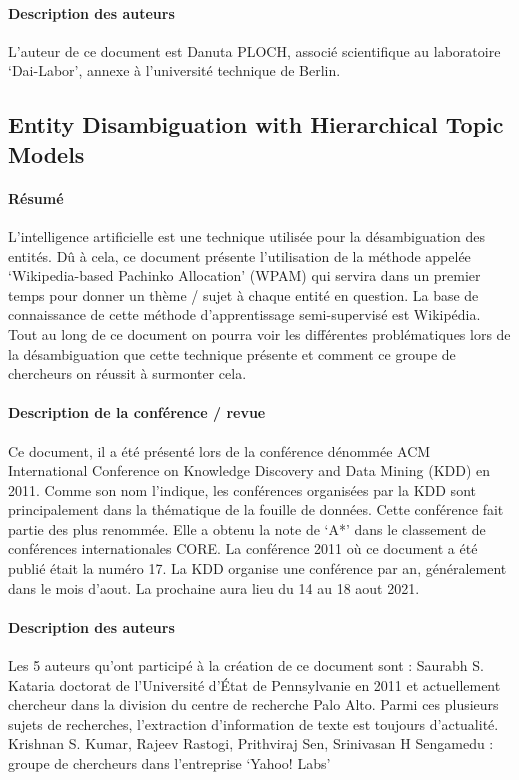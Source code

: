 \documentclass{article}
\begin{document}
\paragraph{Description des auteurs}
L’auteur de ce document est Danuta PLOCH, associé scientifique au laboratoire ‘Dai-Labor’, annexe à l’université technique de Berlin.


\subsection{Entity Disambiguation with Hierarchical Topic Models \cite{article-14}}

\paragraph{Résumé}
L’intelligence artificielle est une technique utilisée pour la désambiguation des entités. Dû à cela, ce document présente l’utilisation de la méthode appelée ‘Wikipedia-based
Pachinko Allocation’ (WPAM) qui servira dans un premier temps pour donner un thème / sujet à chaque entité en question. La base de connaissance de cette méthode d’apprentissage semi-supervisé est Wikipédia.  Tout au long de ce document on pourra voir les différentes problématiques lors de la désambiguation que cette technique présente et comment ce groupe de chercheurs on réussit à surmonter cela. 



\paragraph{Description de la conférence / revue}
Ce document, il a été présenté lors de la conférence dénommée ACM International Conference on Knowledge Discovery and Data Mining (KDD) en 2011. 
Comme son nom l’indique, les conférences organisées par la KDD sont principalement dans la thématique de la fouille de données. Cette conférence fait partie des plus renommée. Elle a obtenu la note de ‘A*’ dans le classement de conférences internationales CORE. 
La conférence 2011 où ce document a été publié était la numéro 17. La KDD organise une conférence par an, généralement dans le mois d’aout. La prochaine aura lieu du 14 au 18 aout 2021.


\paragraph{Description des auteurs}
Les 5 auteurs qu'ont participé à la création de ce document sont :
Saurabh S. Kataria doctorat de l’Université d’État de Pennsylvanie en 2011 et actuellement chercheur dans la division du centre de recherche Palo Alto. Parmi ces plusieurs sujets de recherches, l’extraction d’information de texte est toujours d’actualité.
Krishnan S. Kumar, Rajeev Rastogi, Prithviraj Sen, Srinivasan H Sengamedu : groupe de chercheurs dans l’entreprise ‘Yahoo! Labs’
\end{document}
